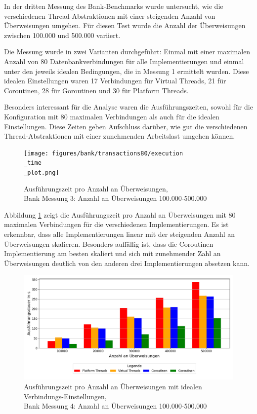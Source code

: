 \documentclass[fontsize=12pt,paper=a4,twoside=semi,parskip=half-,headsepline,headinclude]{scrreprt}
\begin{document}
In der dritten Messung des Bank-Benchmarks wurde untersucht, wie die verschiedenen Thread-Abstraktionen mit einer steigenden Anzahl von Überweisungen umgehen. Für diesen Test wurde die Anzahl der Überweisungen zwischen 100.000 und 500.000 variiert.

Die Messung wurde in zwei Varianten durchgeführt: Einmal mit einer maximalen Anzahl von 80 Datenbankverbindungen für alle Implementierungen und einmal unter den jeweils idealen Bedingungen, die in Messung 1 ermittelt wurden. Diese idealen Einstellungen waren 17 Verbindungen für Virtual Threads, 21 für Coroutinen, 28 für Goroutinen und 30 für Platform Threads.

Besonders interessant für die Analyse waren die Ausführungszeiten, sowohl für die Konfiguration mit 80 maximalen Verbindungen als auch für die idealen Einstellungen. Diese Zeiten geben Aufschluss darüber, wie gut die verschiedenen Thread-Abstraktionen mit einer zunehmenden Arbeitslast umgehen können.

\begin{figure}[H]
	\centering
	\texttt{[image: figures/bank/transactions80/execution\\\_time\\\_plot.png]}
	\caption{Ausführungszeit pro Anzahl an Überweisungen,\\ Bank Messung 3: Anzahl an Überweisungen 100.000-500.000}
	\label{fig:bankTransactions80Zeit}
\end{figure}

Abbildung \ref{fig:bankTransactions80Zeit} zeigt die Ausführungszeit pro Anzahl an Über\-wei\-sung\-en mit 80 maximalen Verbindungen für die verschiedenen Implementierungen. Es ist erkennbar, dass alle Implementierungen linear mit der steigenden Anzahl an Überweisungen skalieren. Besonders auffällig ist, dass die Coroutinen-Implementierung am besten skaliert und sich mit zunehmender Zahl an Überweisungen deutlich von den anderen drei Implementierungen absetzen kann.

\begin{figure}[H]
	\centering
	\includegraphics[scale=0.5]{figures/bank/transactionsIdeal/execution_time_plot.png}
	\caption{Ausführungszeit pro Anzahl an Überweisungen mit idealen Verbindungs-Einstellungen,\\ Bank Messung 4: Anzahl an Überweisungen 100.000-500.000}
	\label{fig:bankTransactionsIdealZeit}
\end{figure}
\end{document}
